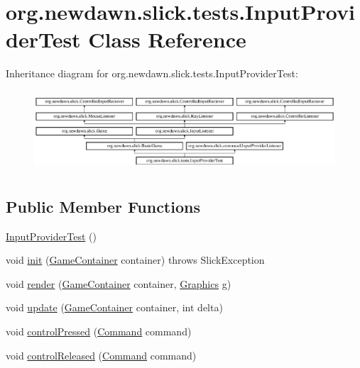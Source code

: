 \hypertarget{classorg_1_1newdawn_1_1slick_1_1tests_1_1_input_provider_test}{}\section{org.\+newdawn.\+slick.\+tests.\+Input\+Provider\+Test Class Reference}
\label{classorg_1_1newdawn_1_1slick_1_1tests_1_1_input_provider_test}
Inheritance diagram for org.\+newdawn.\+slick.\+tests.\+Input\+Provider\+Test\+:\begin{figure}[H]
\begin{center}
\leavevmode
\includegraphics[height=3.040174cm]{classorg_1_1newdawn_1_1slick_1_1tests_1_1_input_provider_test}
\end{center}
\end{figure}
\subsection*{Public Member Functions}
\begin{DoxyCompactItemize}
\item 
\mbox{\hyperlink{classorg_1_1newdawn_1_1slick_1_1tests_1_1_input_provider_test_ac6ab40655e43c6a108007f014f4ee12a}{Input\+Provider\+Test}} ()
\item 
void \mbox{\hyperlink{classorg_1_1newdawn_1_1slick_1_1tests_1_1_input_provider_test_a8ad5b9906f771a9d63e0a60df3993fcb}{init}} (\mbox{\hyperlink{classorg_1_1newdawn_1_1slick_1_1_game_container}{Game\+Container}} container)  throws Slick\+Exception 
\item 
void \mbox{\hyperlink{classorg_1_1newdawn_1_1slick_1_1tests_1_1_input_provider_test_a6b981fe1165f32a4c2d98179e693fc23}{render}} (\mbox{\hyperlink{classorg_1_1newdawn_1_1slick_1_1_game_container}{Game\+Container}} container, \mbox{\hyperlink{classorg_1_1newdawn_1_1slick_1_1_graphics}{Graphics}} g)
\item 
void \mbox{\hyperlink{classorg_1_1newdawn_1_1slick_1_1tests_1_1_input_provider_test_adda44b955459185b6cb6f61211f23b72}{update}} (\mbox{\hyperlink{classorg_1_1newdawn_1_1slick_1_1_game_container}{Game\+Container}} container, int delta)
\item 
void \mbox{\hyperlink{classorg_1_1newdawn_1_1slick_1_1tests_1_1_input_provider_test_a5f5dd215fc34d2df28f71d4739fd9c81}{control\+Pressed}} (\mbox{\hyperlink{interfaceorg_1_1newdawn_1_1slick_1_1command_1_1_command}{Command}} command)
\item 
void \mbox{\hyperlink{classorg_1_1newdawn_1_1slick_1_1tests_1_1_input_provider_test_a68bf86e0de9df06f1a129faa2337a662}{control\+Released}} (\mbox{\hyperlink{interfaceorg_1_1newdawn_1_1slick_1_1command_1_1_command}{Command}} command)
\end{DoxyCompactItemize}
